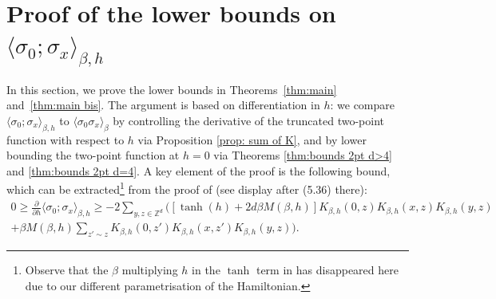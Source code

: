 \documentclass[10pt,a4paper]{amsart}
\numberwithin{equation}{section}
\begin{document}
\section{Proof of the lower bounds on $\langle \sigma_0;\sigma_x\rangle_{\beta,h}$}\label{sec:lower bounds}
In this section, we prove the lower bounds in Theorems~\ref{thm:main} 
and~\ref{thm:main bis}. The argument is based on differentiation in $h$: 
we compare $\langle\sigma_0;\sigma_x\rangle_{\beta,h}$ to 
$\langle\sigma_0\sigma_x\rangle_{\beta}$ by controlling the derivative of 
the truncated two-point function with respect to $h$ via 
Proposition \ref{prop: sum of K}, and by lower 
bounding the two-point function at $h=0$ via Theorems \ref{thm:bounds 2pt d>4} and \ref{thm:bounds 2pt d=4}. A key element of the proof is the following bound, which can be extracted\footnote{Observe that the $\beta$ multiplying $h$ in the $\tanh$ term in \cite{AizenmanFernandezCriticalBehaviorMagnetization1986} has disappeared here due to our different parametrisation of the Hamiltonian.} from the proof of \cite[Theorem~5.7]{AizenmanFernandezCriticalBehaviorMagnetization1986} (see display after (5.36) there):
\begin{multline}\label{eq: lb on derivative in h of 2pt}
	0\geq \frac{\partial}{\partial h}\langle \sigma_0;\sigma_x\rangle_{\beta,h}\geq -2\sum_{y,z\in \mathbb Z^d}\Big([\tanh(h)+2d\beta M(\beta,h)]K_{\beta,h}(0,z)K_{\beta,h}(x,z)K_{\beta,h}(y,z)\\+\beta M(\beta,h)\sum_{z'\sim z}K_{\beta,h}(0,z')K_{\beta,h}(x,z')K_{\beta,h}(y,z)\Big).
\end{multline}
\end{document}
